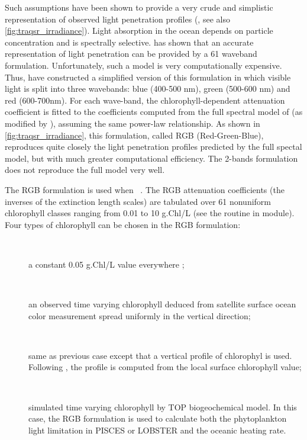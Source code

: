\documentclass[../main/NEMO_manual]{subfiles}
\begin{document}
Such assumptions have been shown to provide a very crude and simplistic representation of
observed light penetration profiles (\cite{Morel_JGR88}, see also \autoref{fig:traqsr_irradiance}).
Light absorption in the ocean depends on particle concentration and is spectrally selective.
\cite{Morel_JGR88} has shown that an accurate representation of light penetration can be provided by
a 61 waveband formulation.
Unfortunately, such a model is very computationally expensive.
Thus, \cite{Lengaigne_al_CD07} have constructed a simplified version of this formulation in which
visible light is split into three wavebands: blue (400-500 nm), green (500-600 nm) and red (600-700nm).
For each wave-band, the chlorophyll-dependent attenuation coefficient is fitted to the coefficients computed from
the full spectral model of \cite{Morel_JGR88} (as modified by \cite{Morel_Maritorena_JGR01}),
assuming the same power-law relationship.
As shown in \autoref{fig:traqsr_irradiance}, this formulation, called RGB (Red-Green-Blue),
reproduces quite closely the light penetration profiles predicted by the full spectal model,
but with much greater computational efficiency.
The 2-bands formulation does not reproduce the full model very well.

The RGB formulation is used when ~.
The RGB attenuation coefficients (\ie the inverses of the extinction length scales) are tabulated over
61 nonuniform chlorophyll classes ranging from 0.01 to 10 g.Chl/L
(see the routine  in  module).
Four types of chlorophyll can be chosen in the RGB formulation:

\begin{description}
\item[~]
  a constant 0.05 g.Chl/L value everywhere ; 
\item[~]
  an observed time varying chlorophyll deduced from satellite surface ocean color measurement spread uniformly in
  the vertical direction;
\item[~]
  same as previous case except that a vertical profile of chlorophyl is used.
  Following \cite{Morel_Berthon_LO89}, the profile is computed from the local surface chlorophyll value;
\item[~]
  simulated time varying chlorophyll by TOP biogeochemical model.
  In this case, the RGB formulation is used to calculate both the phytoplankton light limitation in
  PISCES or LOBSTER and the oceanic heating rate.
\end{description} 
\end{document}
